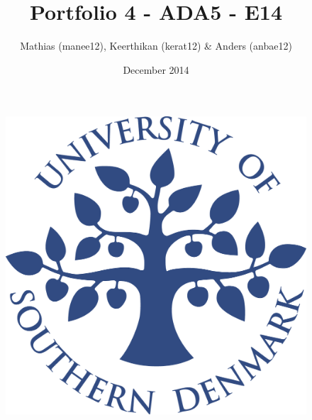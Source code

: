 \title{Portfolio 4 - ADA5 - E14}
\author{Mathias (manee12), Keerthikan (kerat12) \& Anders (anbae12)}
\date{December 2014}
\begin{figure}
\centering
\includegraphics[width=1\textwidth]{graphics/forside.png}
\end{figure}
\maketitle